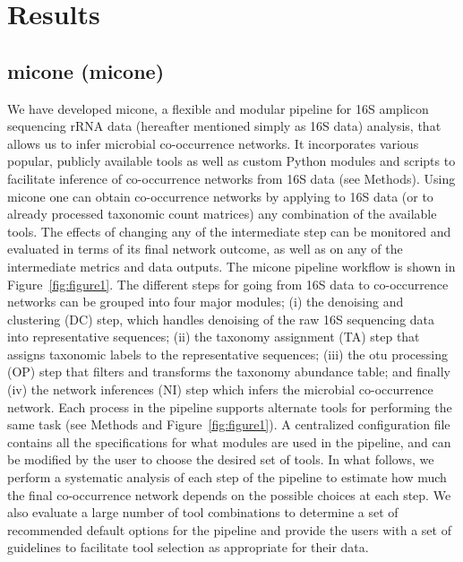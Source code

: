 
\section*{Results}

  \subsection*{\acl{micone} (\acs{micone})}

  We have developed \ac{micone}, a flexible and modular pipeline for 16S amplicon sequencing rRNA data (hereafter mentioned simply as 16S data) analysis, that allows us to infer microbial co-occurrence networks.
  It incorporates various popular, publicly available tools as well as custom Python modules and scripts to facilitate inference of co-occurrence networks from 16S data (see Methods).
  Using \ac{micone} one can obtain co-occurrence networks by applying to 16S data (or to already processed taxonomic count matrices) any combination of the available tools.
  The effects of changing any of the intermediate step can be monitored and evaluated in terms of its final network outcome, as well as on any of the intermediate metrics and data outputs.
  The \ac{micone} pipeline workflow is shown in Figure~\ref{fig:figure1}.
  The different steps for going from 16S data to co-occurrence networks can be grouped into four major modules; (i) the denoising and clustering (DC) step, which handles denoising of the raw 16S sequencing data into representative sequences; (ii) the taxonomy assignment (TA) step that assigns taxonomic labels to the representative sequences; (iii) the \ac{otu} processing (OP) step that filters and transforms the taxonomy abundance table; and finally (iv) the network inferences (NI) step which infers the microbial co-occurrence network.
  Each process in the pipeline supports alternate tools for performing the same task (see Methods and Figure~\ref{fig:figure1}).
  A centralized configuration file contains all the specifications for what modules are used in the pipeline, and can be modified by the user to choose the desired set of tools.
  In what follows, we perform a systematic analysis of each step of the pipeline to estimate how much the final co-occurrence network depends on the possible choices at each step.
  We also evaluate a large number of tool combinations to determine a set of recommended default options for the pipeline and provide the users with a set of guidelines to facilitate tool selection as appropriate for their data.

